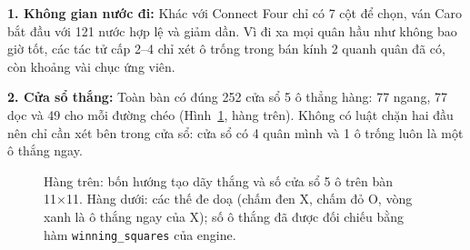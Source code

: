 \documentclass[12pt,a4paper]{report}
\newcommand{\luoi}[1]{\draw[gray!55, line width=.3pt, step=1] (0,0) grid (#1,-#1); \draw[gray!90] (0,0) rectangle (#1,-#1);}
\newcommand{\dX}[2]{\fill[quanx] (#2+.5,-#1-.5) circle (.36);}
\newcommand{\dO}[2]{\fill[quano] (#2+.5,-#1-.5) circle (.36);}
\newcommand{\oThang}[2]{\draw[luc, line width=1pt] (#2+.5,-#1-.5) circle (.34); \fill[luc] (#2+.5,-#1-.5) circle (.1);}
\newcommand{\tenhinh}[2]{\node[anchor=south, font=\footnotesize\bfseries, align=center] at (3.5,0.1) {#1}; \node[anchor=north, font=\footnotesize, align=center] at (3.5,-7.1) {#2};}
\begin{document}
\textbf{1. Không gian nước đi:} Khác với Connect Four chỉ có 7 cột để chọn, ván Caro bắt đầu với 121 nước hợp lệ và giảm dần. Vì đi xa mọi quân hầu như không bao giờ tốt, các tác tử cấp 2--4 chỉ xét ô trống trong bán kính 2 quanh quân đã có, còn khoảng vài chục ứng viên.

\textbf{2. Cửa sổ thắng:} Toàn bàn có đúng 252 cửa sổ 5 ô thẳng hàng: 77 ngang, 77 dọc và 49 cho mỗi đường chéo (Hình~\ref{fig:mau}, hàng trên). Không có luật chặn hai đầu nên chỉ cần xét bên trong cửa sổ: cửa sổ có 4 quân mình và 1 ô trống luôn là một ô thắng ngay.

\begin{figure}[H]
  \centering
  \caption{Hàng trên: bốn hướng tạo dãy thắng và số cửa sổ 5 ô trên bàn 11×11. Hàng dưới: các thế đe doạ (chấm đen X, chấm đỏ O, vòng xanh là ô thắng ngay của X); số ô thắng đã được đối chiếu bằng hàm \texttt{winning\_squares} của engine.}
  \label{fig:mau}
\end{figure}
\end{document}
